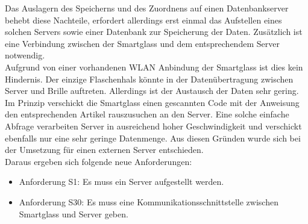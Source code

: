 Das Auslagern des Speicherns und des Zuordnens auf einen Datenbankserver behebt diese Nachteile, erfordert allerdings erst einmal das Aufstellen eines solchen Servers sowie einer Datenbank zur Speicherung der Daten. Zusätzlich ist eine Verbindung zwischen der Smartglass und dem entsprechendem Server notwendig. 
\\
Aufgrund von einer vorhandenen WLAN Anbindung der Smartglass ist dies kein Hindernis. Der einzige Flaschenhals könnte in der Datenübertragung zwischen Server und Brille auftreten. Allerdings ist der Austausch der Daten sehr gering. Im Prinzip verschickt die Smartglass einen gescannten Code mit der Anweisung den entsprechenden Artikel rauszusuchen an den Server. Eine solche einfache Abfrage verarbeiten Server in ausreichend hoher Geschwindigkeit und verschickt ebenfalls nur eine sehr geringe Datenmenge. Aus diesen Gründen wurde sich bei der Umsetzung für einen externen Server entschieden.
\\
Daraus ergeben sich folgende neue Anforderungen: 
\begin{itemize}
	\item Anforderung S1: Es muss ein Server aufgestellt werden.
	\item Anforderung S30: Es muss eine Kommunikationsschnittstelle zwischen Smartglass und Server geben.
\end{itemize}

